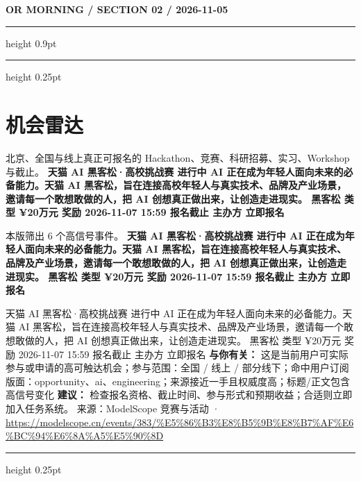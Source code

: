 \documentclass[10.5pt]{ctexart}
\begin{document}
\newpage
{\small\bfseries OR MORNING / SECTION 02 / 2026-11-05}
\vspace{2mm}
\hrule height 0.9pt
\vspace{1.5mm}
\hrule height 0.25pt
\vspace{4mm}
\section*{机会雷达}
{\color{ormuted} 北京、全国与线上真正可报名的 Hackathon、竞赛、科研招募、实习、Workshop 与截止。}
\vspace{2mm}
{\LARGE\bfseries 天猫 AI 黑客松·高校挑战赛 进行中 AI 正在成为年轻人面向未来的必备能力。天猫 AI 黑客松，旨在连接高校年轻人与真实技术、品牌及产业场景，邀请每一个敢想敢做的人，把 AI 创想真正做出来，让创造走进现实。 黑客松 类型 ¥20万元 奖励 2026-11-07 15:59 报名截止 主办方 立即报名}\par
\vspace{1mm}
{\color{ormuted} 本版筛出 6 个高信号事件。}
\vspace{3mm}
{\Large\bfseries 天猫 AI 黑客松·高校挑战赛 进行中 AI 正在成为年轻人面向未来的必备能力。天猫 AI 黑客松，旨在连接高校年轻人与真实技术、品牌及产业场景，邀请每一个敢想敢做的人，把 AI 创想真正做出来，让创造走进现实。 黑客松 类型 ¥20万元 奖励 2026-11-07 15:59 报名截止 主办方 立即报名}\par
天猫 AI 黑客松·高校挑战赛 进行中 AI 正在成为年轻人面向未来的必备能力。天猫 AI 黑客松，旨在连接高校年轻人与真实技术、品牌及产业场景，邀请每一个敢想敢做的人，把 AI 创想真正做出来，让创造走进现实。 黑客松 类型 ¥20万元 奖励 2026-11-07 15:59 报名截止 主办方 立即报名
\textbf{与你有关：} 这是当前用户可实际参与或申请的高可触达机会；参与范围：全国 / 线上 / 部分线下；命中用户订阅版面：opportunity、ai、engineering；来源接近一手且权威度高；标题/正文包含高信号变化
\textbf{建议：} 检查报名资格、截止时间、参与形式和预期收益；合适则立即加入任务系统。
{\footnotesize\color{ormuted} 来源：ModelScope 竞赛与活动 · \url{https://modelscope.cn/events/383/%E5%86%B3%E8%B5%9B%E8%B7%AF%E6%BC%94%E6%8A%A5%E5%90%8D}}
\vspace{4mm}
\hrule height 0.25pt
\vspace{3mm}
\end{document}
